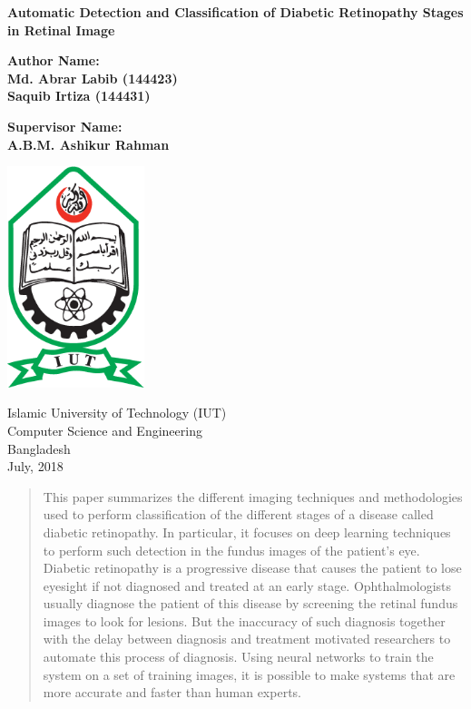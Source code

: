 \documentclass[12pt]{report}
\begin{document}
\begin{titlepage}
    \begin{center}
        \vspace*{1cm}
        \Large
        \textbf{Automatic Detection and Classification of Diabetic Retinopathy Stages in Retinal Image}
        \normalsize
        \vspace{0.5cm}
        
        \vspace{1.5cm}
        
        \textbf{Author Name:}\\
        \textbf{Md. Abrar Labib (144423)}\\
        \textbf{Saquib Irtiza (144431)}\\
        
        \vfill
        
        \textbf{Supervisor Name:}\\
        \textbf{A.B.M. Ashikur Rahman}\\
        
        \vspace{0.6cm}
        
        \includegraphics[width=0.3\textwidth]{iut}
        
        Islamic University of Technology (IUT)\\
        Computer Science and Engineering\\
        Bangladesh\\
        July, 2018
        
    \end{center}
\end{titlepage}
\Large
\begin{abstract}
\normalsize
\noindent This paper summarizes the different imaging techniques and methodologies used to perform classification of the different stages of a disease called diabetic retinopathy. In particular, it focuses on deep learning techniques to perform such detection in the fundus images of the patient's eye. Diabetic retinopathy is a progressive disease that causes the patient to lose eyesight if not diagnosed and treated at an early stage. Ophthalmologists usually diagnose the patient of this disease by screening the retinal fundus images to look for lesions. But the inaccuracy of such diagnosis together with the delay between diagnosis and treatment motivated researchers to automate this process of diagnosis. Using neural networks to train the system on a set of training images, it is possible to make systems that are more accurate and faster than human experts.  
\end{abstract}
\end{document}
